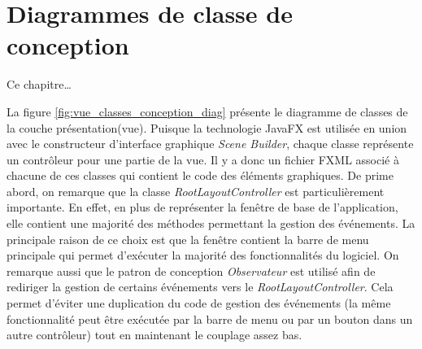
\chapter{Diagrammes de classe de conception}
\label{s:classe_conception}

Ce chapitre\ldots

La figure \ref{fig:vue_classes_conception_diag} présente le diagramme de classes de la couche présentation(vue). Puisque la technologie JavaFX est utilisée en union avec le constructeur d'interface graphique \textit{Scene Builder}, chaque classe représente un contrôleur pour une partie de la vue. Il y a donc un fichier FXML associé à chacune de ces classes qui contient le code des éléments graphiques. De prime abord, on remarque que la classe \textit{RootLayoutController} est particulièrement importante. En effet, en plus de représenter la fenêtre de base de l'application, elle contient une majorité des méthodes permettant la gestion des événements. La principale raison de ce choix est que la fenêtre contient la barre de menu principale qui permet d'exécuter la majorité des fonctionnalités du logiciel. On remarque aussi que le patron de conception \textit{Observateur} est utilisé afin de rediriger la gestion de certains événements vers le \textit{RootLayoutController}. Cela permet d'éviter une duplication du code de gestion des événements (la même fonctionnalité peut être exécutée par la barre de menu ou par un bouton dans un autre contrôleur) tout en maintenant le couplage assez bas.

